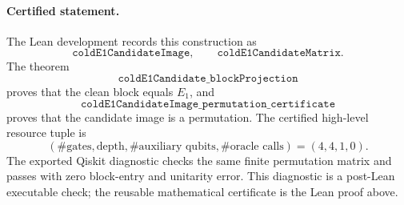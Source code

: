 \paragraph{Certified statement.}
The Lean development records this construction as
\[
  \texttt{coldE1CandidateImage},\qquad
  \texttt{coldE1CandidateMatrix}.
\]
The theorem
\[
  \texttt{coldE1Candidate\_blockProjection}
\]
proves that the clean block equals \(E_1\), and
\[
  \texttt{coldE1CandidateImage\_permutation\_certificate}
\]
proves that the candidate image is a permutation.  The certified high-level
resource tuple is
\[
  (\#\text{gates},\text{depth},\#\text{auxiliary qubits},\#\text{oracle calls})
  =
  (4,4,1,0).
\]
The exported Qiskit diagnostic checks the same finite permutation matrix and
passes with zero block-entry and unitarity error.  This diagnostic is a
post-Lean executable check; the reusable mathematical certificate is the Lean
proof above.

